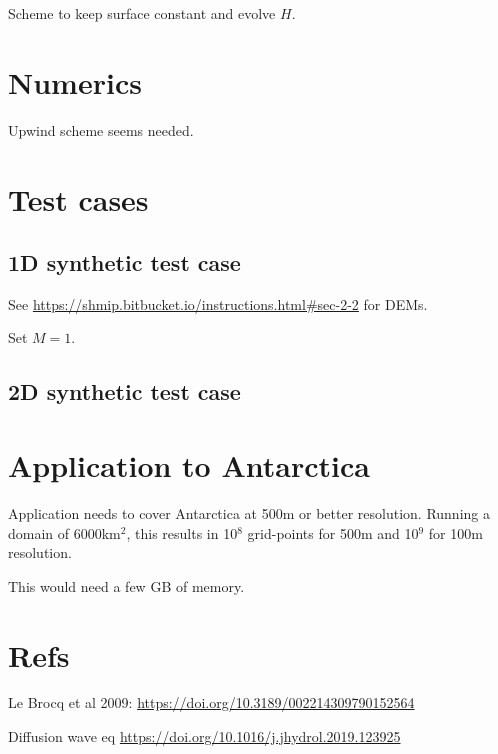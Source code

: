 \documentclass[DIV=13,halfparskip,11pt,headinclude]{scrartcl}
\begin{document}
Scheme to keep surface constant and evolve $H$.

\section{Numerics}

Upwind scheme seems needed.

\section{Test cases}
\label{sec:orgb000489}
\subsection{1D synthetic test case}
\label{sec:org1b6b5f1}

See \url{https://shmip.bitbucket.io/instructions.html\#sec-2-2} for DEMs.

Set \(M=1\).

\subsection{2D synthetic test case}
\label{sec:org08a60fa}

\section{Application to Antarctica}
\label{sec:orgf1a5640}

Application needs to cover Antarctica at 500m or better resolution.
Running a domain of 6000km\(^{\text{2}}\), this results in 10\(^{\text{8}}\) grid-points for 500m and
10\(^{\text{9}}\) for 100m resolution.

This would need a few GB of memory.

\section{Refs}
\label{sec:org50e7c95}
Le Brocq et al 2009: \url{https://doi.org/10.3189/002214309790152564}

Diffusion wave eq \url{https://doi.org/10.1016/j.jhydrol.2019.123925}
\end{document}
